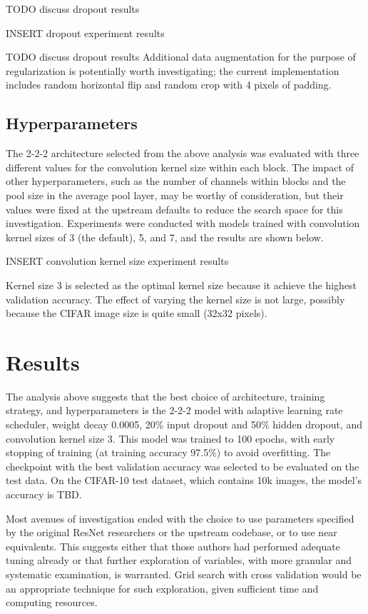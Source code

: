 \documentclass[letterpaper]{article} %
\begin{document}
TODO discuss dropout results

INSERT dropout experiment results

TODO discuss dropout results
Additional data augmentation for the purpose of regularization is potentially worth investigating; the current
implementation includes random horizontal flip and random crop with 4 pixels of padding.

\subsection{Hyperparameters}

The 2-2-2 architecture selected from the above analysis was evaluated with three different values for the convolution
kernel size within each block.
The impact of other hyperparameters, such as the number of channels within blocks and the pool size in the average pool
layer, may be worthy of consideration, but their values were fixed at the upstream defaults to reduce the search space
for this investigation.
Experiments were conducted with models trained with convolution kernel sizes of 3 (the default), 5, and 7, and the
results are shown below.

INSERT convolution kernel size experiment results

Kernel size 3 is selected as the optimal kernel size because it achieve the highest validation accuracy.
The effect of varying the kernel size is not large, possibly because the CIFAR image size is quite small (32x32 pixels).

\section{Results}

The analysis above suggests that the best choice of architecture, training strategy, and hyperparameters is the 2-2-2
model with adaptive learning rate scheduler, weight decay 0.0005, 20\% input dropout and 50\% hidden dropout, and
convolution kernel size 3.
This model was trained to 100 epochs, with early stopping of training (at training accuracy 97.5\%) to avoid overfitting.
The checkpoint with the best validation accuracy was selected to be evaluated on the test data.
On the CIFAR-10 test dataset, which contains 10k images, the model's accuracy is TBD.

Most avenues of investigation ended with the choice to use parameters specified by the original ResNet researchers or
the upstream codebase, or to use near equivalents.
This suggests either that those authors had performed adequate tuning already or that further exploration of variables,
with more granular and systematic examination, is warranted.
Grid search with cross validation would be an appropriate technique for such exploration, given sufficient time and
computing resources.


\end{document}
